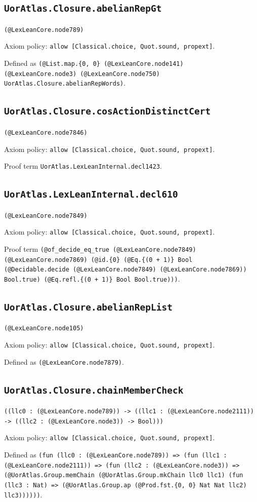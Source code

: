 \documentclass[11pt]{article}
\begin{document}
\subsection*{\texttt{UorAtlas.Closure.abelianRepGt}}
\noindent\texttt{(@LexLeanCore.node789)}\par
\noindent Axiom policy: \texttt{allow [Classical.choice, Quot.sound, propext]}.\par
\noindent Defined as \texttt{(@List.map.\{0, 0\} (@LexLeanCore.node141) (@LexLeanCore.node3) (@LexLeanCore.node750) UorAtlas.Closure.abelianRepWords)}.\par
\subsection*{\texttt{UorAtlas.Closure.cosActionDistinctCert}}
\noindent\texttt{(@LexLeanCore.node7846)}\par
\noindent Axiom policy: \texttt{allow [Classical.choice, Quot.sound, propext]}.\par
\noindent Proof term \texttt{UorAtlas.LexLeanInternal.decl1423}.\par
\subsection*{\texttt{UorAtlas.LexLeanInternal.decl610}}
\noindent\texttt{(@LexLeanCore.node7849)}\par
\noindent Axiom policy: \texttt{allow [Classical.choice, Quot.sound, propext]}.\par
\noindent Proof term \texttt{(@of\_decide\_eq\_true (@LexLeanCore.node7849) (@LexLeanCore.node7869) (@id.\{0\} (@Eq.\{(0 + 1)\} Bool (@Decidable.decide (@LexLeanCore.node7849) (@LexLeanCore.node7869)) Bool.true) (@Eq.refl.\{(0 + 1)\} Bool Bool.true)))}.\par
\subsection*{\texttt{UorAtlas.Closure.abelianRepList}}
\noindent\texttt{(@LexLeanCore.node105)}\par
\noindent Axiom policy: \texttt{allow [Classical.choice, Quot.sound, propext]}.\par
\noindent Defined as \texttt{(@LexLeanCore.node7879)}.\par
\subsection*{\texttt{UorAtlas.Closure.chainMemberCheck}}
\noindent\texttt{((llc0 : (@LexLeanCore.node789)) -> ((llc1 : (@LexLeanCore.node2111)) -> ((llc2 : (@LexLeanCore.node3)) -> Bool)))}\par
\noindent Axiom policy: \texttt{allow [Classical.choice, Quot.sound, propext]}.\par
\noindent Defined as \texttt{(fun (llc0 : (@LexLeanCore.node789)) => (fun (llc1 : (@LexLeanCore.node2111)) => (fun (llc2 : (@LexLeanCore.node3)) => (@UorAtlas.Group.memChain (@UorAtlas.Group.mkChain llc0 llc1) (fun (llc3 : Nat) => (@UorAtlas.Group.ap (@Prod.fst.\{0, 0\} Nat Nat llc2) llc3))))))}.\par
\end{document}
